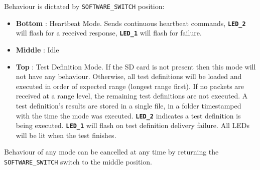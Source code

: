 Behaviour is dictated by \texttt{SOFTWARE\_SWITCH} position:
\vspace{-5mm}
\begin{itemize}
	\item \textbf{Bottom} : Heartbeat Mode. Sends continuous heartbeat commands, \textbf{\texttt{LED\_2}} will flash for a received response, \textbf{\texttt{LED\_1}} will flash for failure.
	\item \textbf{Middle} : Idle
	\item \textbf{Top} : Test Definition Mode. If the SD card is not present then this mode will not have any behaviour. Otherwise, all test definitions will be loaded and executed in order of expected range (longest range first). If no packets are received at a range level, the remaining test definitions are not executed. A test definition's results are stored in a single file, in a folder timestamped with the time the mode was executed. \textbf{\texttt{LED\_2}} indicates a test definition is being executed. \textbf{\texttt{LED\_1}} will flash on test definition delivery failure. All LEDs will be lit when the test finishes.
\end{itemize}
Behaviour of any mode can be cancelled at any time by returning the \texttt{SOFTWARE\_SWITCH} switch to the middle position.











